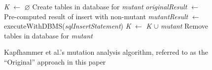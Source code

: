 
\begin{figure}[h]
\begin{algorithmic}
\footnotesize

\State \emph{K} $ \gets $ \emph{$\varnothing$}
	\State Create tables in database for \emph{mutant}
		\State \emph{originalResult} $ \gets $ Pre-computed result of insert with non-mutant 
		\State \emph{mutantResult} $ \gets $ executeWithDBMS(\emph{sqlInsertStatement})
			\State \emph{K} $ \gets $ \emph{K} $\cup$ \emph{mutant}
		\EndIf
	\EndFor
	\State Remove tables in database for \emph{mutant}
\EndFor

\end{algorithmic}

\caption{\label{alg:original}Kapfhammer et al.'s mutation analysis algorithm, referred to as the ``Original'' approach in this paper}
\vspace{-1em}
\end{figure}
